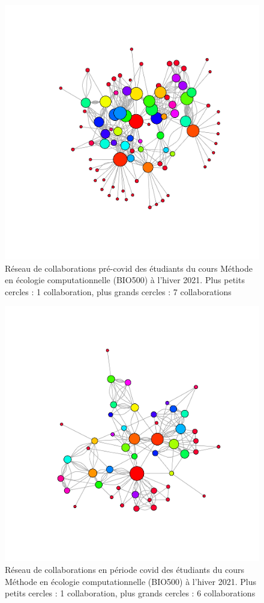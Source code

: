 \documentclass[12pt]{article}
\begin{document}
\begin{figure}
    \centering
    \includegraphics[width=1\textwidth]{figures/fig2.pdf}
    \caption{Réseau de collaborations pré-covid des étudiants du cours Méthode en écologie computationnelle (BIO500) à l’hiver 2021. Plus petits cercles : 1 collaboration, plus grands cercles : 7 collaborations}
    \label{fig2}
\end{figure}

\begin{figure}
    \centering
    \includegraphics[width=1\textwidth]{figures/fig3.pdf}
    \caption{Réseau de collaborations en période covid des étudiants du cours Méthode en écologie computationnelle (BIO500) à l’hiver 2021. Plus petits cercles : 1 collaboration, plus grands cercles : 6 collaborations}
    \label{fig3}
\end{figure}
\end{document}

